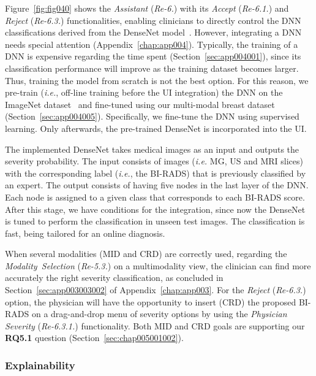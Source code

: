 \textcolor{revised}{Figure~\ref{fig:fig040} shows the {\it Assistant} ({\it Re-6.}) with its {\it Accept} ({\it Re-6.1.}) and {\it Reject} ({\it Re-6.3.}) functionalities, enabling clinicians to directly control the \ac{DNN} classifications derived from the DenseNet model~\cite{Huang_2017_CVPR}.
However, integrating a \ac{DNN} needs special attention (Appendix~\ref{chap:app004}).
Typically, the training of a \ac{DNN} is expensive regarding the time spent (Section~\ref{sec:app004001}), since its classification performance will improve as the training dataset becomes larger.
Thus, training the model from scratch is not the best option.
For this reason, we pre-train ({\it i.e.}, off-line training before the \ac{UI} integration) the \ac{DNN} on the ImageNet dataset~\cite{10.1145/3351095.3375709} and fine-tuned using our multi-modal breast dataset (Section~\ref{sec:app004005}).
Specifically, we fine-tune the \ac{DNN} using supervised learning.
Only afterwards, the pre-trained DenseNet is incorporated into the \ac{UI}.}

The implemented DenseNet takes medical images as an input and outputs the severity probability.
The input consists of images ({\it i.e.} \ac{MG}, \ac{US} and \ac{MRI} slices) with the corresponding label ({\it i.e.}, the \ac{BI-RADS}) that is previously classified by an expert.
The output consists of having five nodes in the last layer of the \ac{DNN}.
Each node is assigned to a given class that corresponds to each \ac{BI-RADS} score.
After this stage, we have conditions for the integration, since now the DenseNet is tuned to perform the classification in unseen test images.
The classification is fast, being tailored for an online diagnosis.

\textcolor{revised}{When several modalities (\ac{MID} and \ac{CRD}) are correctly used, regarding the {\it Modality~Selection} ({\it Re-5.3.}) on a multimodality view, the clinician can find more accurately the right severity classification, as concluded in Section~\ref{sec:app003003002} of Appendix~\ref{chap:app003}.
For the {\it Reject} ({\it Re-6.3.}) option, the physician will have the opportunity to insert (\ac{CRD}) the proposed \ac{BI-RADS} on a drag-and-drop menu of severity options by using the {\it Physician Severity} ({\it Re-6.3.1.}) functionality.
Both \ac{MID} and \ac{CRD} goals are supporting our {\bf RQ5.1} question (Section~\ref{sec:chap005001002}).}

\subsubsection{Explainability}
\label{sec:chap005004002002}

